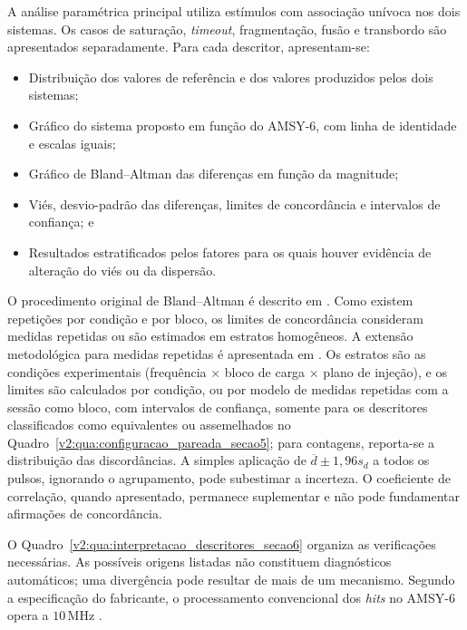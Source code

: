 A análise paramétrica principal utiliza estímulos com associação unívoca nos dois sistemas. Os casos de saturação, \textit{timeout}, fragmentação, fusão e transbordo são apresentados separadamente. Para cada descritor, apresentam-se:

\begin{itemize}
	\item Distribuição dos valores de referência e dos valores produzidos pelos dois sistemas;
	
	\item Gráfico do sistema proposto em função do AMSY-6, com linha de identidade e escalas iguais;
	
	\item Gráfico de Bland--Altman das diferenças em função da magnitude;
	
	\item Viés, desvio-padrão das diferenças, limites de concordância e intervalos de confiança; e
	
	\item Resultados estratificados pelos fatores para os quais houver evidência de alteração do viés ou da dispersão.
\end{itemize}

O procedimento original de Bland--Altman é descrito em \cite{bland1986}. Como existem repetições por condição e por bloco, os limites de concordância consideram medidas repetidas ou são estimados em estratos homogêneos. A extensão metodológica para medidas repetidas é apresentada em \cite{bland1999}. Os estratos são as condições experimentais (frequência \(\times\) bloco de carga \(\times\) plano de injeção), e os limites são calculados por condição, ou por modelo de medidas repetidas com a sessão como bloco, com intervalos de confiança, somente para os descritores classificados como equivalentes ou assemelhados no Quadro~\ref{v2:qua:configuracao_pareada_secao5}; para contagens, reporta-se a distribuição das discordâncias. A simples aplicação de \(\overline{d}\pm1{,}96s_d\) a todos os pulsos, ignorando o agrupamento, pode subestimar a incerteza. O coeficiente de correlação, quando apresentado, permanece suplementar e não pode fundamentar afirmações de concordância.

O Quadro~\ref{v2:qua:interpretacao_descritores_secao6} organiza as verificações necessárias. As possíveis origens listadas não constituem diagnósticos automáticos; uma divergência pode resultar de mais de um mecanismo. Segundo a especificação do fabricante, o processamento convencional dos \textit{hits} no AMSY-6 opera a \(10\,\mathrm{MHz}\) \cite{vallen2022}.

